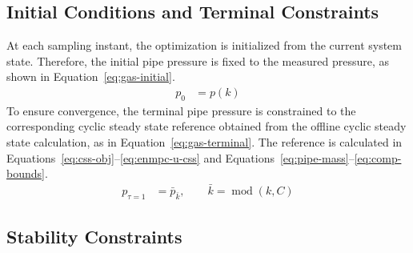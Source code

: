 \documentclass[11pt]{article}
\begin{document}
\subsection{Initial Conditions and Terminal Constraints}

At each sampling instant, the optimization is initialized from the current system state. Therefore, the initial pipe pressure is fixed to the measured pressure, as shown in Equation~\eqref{eq:gas-initial}.
\begin{align}
p_0 &= p(k) \label{eq:gas-initial}
\end{align}
To ensure convergence, the terminal pipe pressure is constrained to the corresponding cyclic steady state reference obtained from the offline cyclic steady state calculation, as in Equation~\eqref{eq:gas-terminal}. The reference is calculated in Equations~\eqref{eq:css-obj}--\eqref{eq:enmpc-u-css} and Equations~\eqref{eq:pipe-mass}--\eqref{eq:comp-bounds}. 
\begin{align}
p_{\tau=1} &= \bar{p}_{\bar{k}}, \qquad \bar{k}=\operatorname{mod}(k,C) \label{eq:gas-terminal}
\end{align}

\subsection{Stability Constraints}
\end{document}
